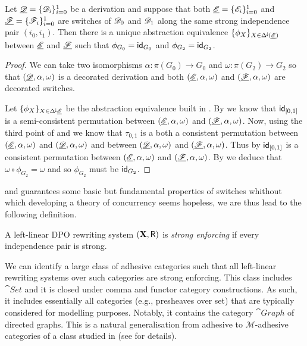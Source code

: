 \begin{corollary}\label{cor:absequi}
	Let $\underline{\mathscr{D}}=\{\mathscr{D}_{i}\}_{i=0}^1$ be a derivation and suppose
that both $\underline{\mathscr{E}}=\{\mathscr{E}_i\}_{i=0}^1$ and
$\underline{\mathscr{F}}=\{\mathscr{F}_i\}_{i=0}^1$ are switches of $\mathscr{D}_0$ and
$\mathscr{D}_1$ along the same strong independence pair $(i_0, i_1)$. Then there is a unique abstraction equivalence $\{\phi_X\}_{X\in \Delta^{\hspace{-1pt}\downarrow\hspace{-1pt}}(\underline{\mathscr{E}})}$ between $\underline{\mathscr{E}}$ and $\underline{\mathscr{F}}$ such that $\phi_{G_0}=\mathsf{id}_{G_0}$ and $\phi_{G_2}=\mathsf{id}_{G_2}$.
\end{corollary}
\begin{proof} We can take two isomorphisms $\alpha\colon \pi(G_0)\to G_0$ and $\omega\colon \pi(G_2)\to G_2$ so that $(\underline{\mathscr{D}}, \alpha, \omega)$ is a decorated derivation and both $(\underline{\mathscr{E}}, \alpha, \omega)$ and $(\underline{\mathscr{F}},\alpha, \omega)$ are decorated switches.
	
Let $\{\phi_X\}_{X\in \Delta^{\hspace{-1pt}\downarrow\hspace{-1pt}}\underline{\mathscr{E}}}$ be the abstraction equivalence built in . By  we know that $\mathsf{id}_{[0,1]}$ is a semi-consistent permutation between $(\underline{\mathscr{E}}, \alpha, \omega)$ and $(\underline{\mathscr{F}}, \alpha, \omega)$. Now, using the third point of  and  we know that $\tau_{0,1}$ is a both a consistent permutation between $(\underline{\mathscr{E}}, \alpha, \omega)$ and $(\underline{\mathscr{D}}, \alpha, \omega)$ and between $(\underline{\mathscr{D}}, \alpha, \omega)$ and $(\underline{\mathscr{F}}, \alpha, \omega)$. Thus by  $\mathsf{id}_{[0,1]}$ is a consistent permutation between $(\underline{\mathscr{E}}, \alpha, \omega)$  and $(\underline{\mathscr{F}}, \alpha, \omega)$.  By  we deduce that $\omega\circ \phi_{G_2}=\omega$ and so $\phi_{G_2}$ must be $\mathsf{id}_{G_2}$.
\end{proof}

 and  guarantees some basic but fundamental properties of switches whithout which developing a theory of concurrency seems hopeless, we are thus lead to the following definition.

\begin{definition}
A left-linear DPO rewriting system $(\textbf {\textup{X}}, \mathsf{R})$ is \emph{strong enforcing} if every independence pair is strong.
\end{definition}

\begin{remark}
We can identify a large class of adhesive categories such that all
left-linear rewriting systems over such categories are strong
enforcing. This class includes $\cat{Set}$ and it is closed
under comma and functor category constructions.  As such, it includes
essentially all categories (e.g., presheaves over set) that are
typically considered for modelling purposes. Notably, it contains the
category $\cat{Graph}$ of directed graphs.
This is a natural generalisation from adhesive to $\mathcal{M}$-adhesive categories of a class studied in \cite{baldan2011adhesivity} (see  for details).
\end{remark}

